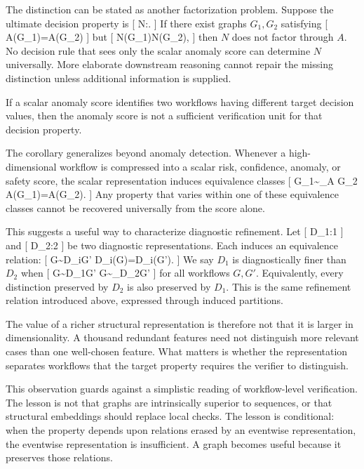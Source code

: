 \documentclass[11pt]{article}
\begin{document}
The distinction can be stated as another factorization problem. Suppose the ultimate decision property is
[
N:.
]
If there exist graphs $G_1,G_2$ satisfying
[
A(G_1)=A(G_2)
]
but
[
N(G_1)\neq N(G_2),
]
then $N$ does not factor through $A$. No decision rule that sees only the scalar anomaly score can determine $N$ universally. More elaborate downstream reasoning cannot repair the missing distinction unless additional information is supplied.

\begin{corollary}
If a scalar anomaly score identifies two workflows having different target decision values, then the anomaly score is not a sufficient verification unit for that decision property.
\end{corollary}

The corollary generalizes beyond anomaly detection. Whenever a high-dimensional workflow is compressed into a scalar risk, confidence, anomaly, or safety score, the scalar representation induces equivalence classes
[
G_1\sim_A G_2
\quad\Longleftrightarrow\quad
A(G_1)=A(G_2).
]
Any property that varies within one of these equivalence classes cannot be recovered universally from the score alone.

This suggests a useful way to characterize diagnostic refinement. Let
[
D_1:\rightarrow{}1
]
and
[
D_2:\rightarrow{}2
]
be two diagnostic representations. Each induces an equivalence relation:
[
G\sim{D_i}G'
\quad\Longleftrightarrow\quad
D_i(G)=D_i(G').
]
We say $D_1$ is diagnostically finer than $D_2$ when
[
G\sim{D_1}G'
\Longrightarrow
G\sim_{D_2}G'
]
for all workflows $G,G'$. Equivalently, every distinction preserved by $D_2$ is also preserved by $D_1$. This is the same refinement relation introduced above, expressed through induced partitions.

The value of a richer structural representation is therefore not that it is larger in dimensionality. A thousand redundant features need not distinguish more relevant cases than one well-chosen feature. What matters is whether the representation separates workflows that the target property requires the verifier to distinguish.

This observation guards against a simplistic reading of workflow-level verification. The lesson is not that graphs are intrinsically superior to sequences, or that structural embeddings should replace local checks. The lesson is conditional: when the property depends upon relations erased by an eventwise representation, the eventwise representation is insufficient. A graph becomes useful because it preserves those relations.
\end{document}
